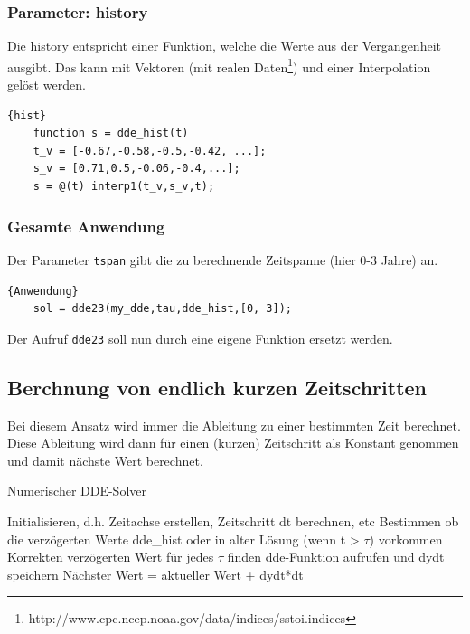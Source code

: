 \subsubsection{Parameter: history}
Die history entspricht einer Funktion, welche die Werte aus der Vergangenheit ausgibt. 
Das kann mit Vektoren (mit realen Daten\footnote{http://www.cpc.ncep.noaa.gov/data/indices/sstoi.indices}) und einer Interpolation gelöst werden.
\begin{lstlisting}[style=MATLAB]{hist}
	function s = dde_hist(t)
	t_v = [-0.67,-0.58,-0.5,-0.42, ...];
	s_v = [0.71,0.5,-0.06,-0.4,...];  
	s = @(t) interp1(t_v,s_v,t);
\end{lstlisting}

\subsubsection{Gesamte Anwendung}
Der Parameter \texttt{tspan} gibt die zu berechnende Zeitspanne (hier 0-3 Jahre) an.
\begin{lstlisting}[style=MATLAB]{Anwendung}
	sol = dde23(my_dde,tau,dde_hist,[0, 3]);
\end{lstlisting}
Der Aufruf \texttt{dde23} soll nun durch eine eigene Funktion ersetzt werden.
 

\subsection{Berchnung von endlich kurzen Zeitschritten}
Bei diesem Ansatz wird immer die Ableitung zu einer bestimmten Zeit berechnet.
Diese Ableitung wird dann für einen (kurzen) Zeitschritt als Konstant genommen und damit nächste Wert berechnet.
\begin{algorithm}
	\caption{Numerischer DDE-Solver}
	\label{algo1}
	\begin{algorithmic}[1]
		\State Initialisieren, d.h. Zeitachse erstellen, Zeitschritt dt berechnen, etc
		\State Bestimmen ob die verzögerten Werte dde\_hist oder in alter Lösung (wenn t > $\tau$) vorkommen
		\State Korrekten verzögerten Wert für jedes $\tau$ finden
		\EndFor
		\State dde-Funktion aufrufen und dydt speichern
		\State Nächster Wert = aktueller Wert + dydt*dt
		\EndFor
	\end{algorithmic}
\end{algorithm}

